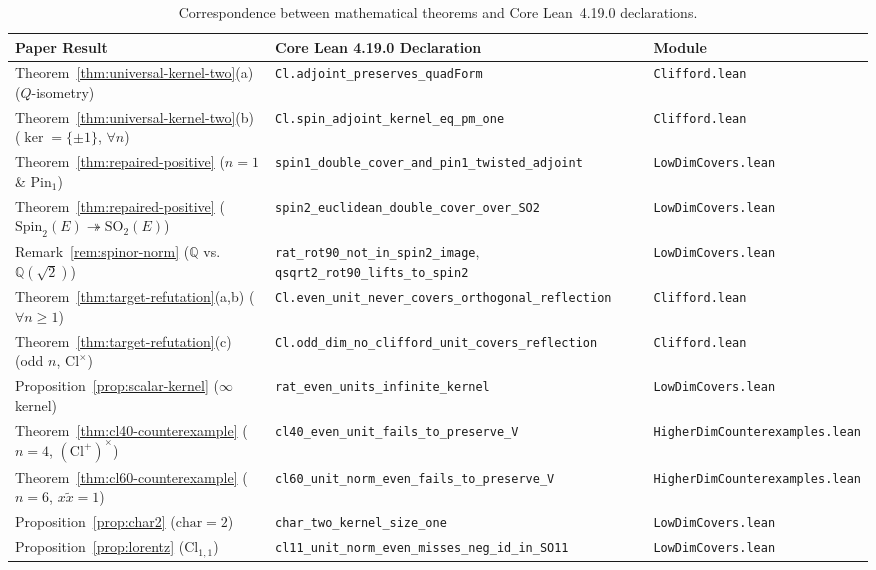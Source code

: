 \documentclass[11pt]{article}
\theoremstyle{definition}
\theoremstyle{remark}
\newcommand{\Cl}{\mathrm{Cl}}
\newcommand{\Spin}{\mathrm{Spin}}
\newcommand{\Pin}{\mathrm{Pin}}
\newcommand{\SO}{\mathrm{SO}}
\begin{document}
\begin{table}[ht]
\centering
\footnotesize
\renewcommand{\arraystretch}{1.22}
\begin{tabular}{@{}>{\raggedright\arraybackslash}p{}>{\raggedright\arraybackslash}p{}>{\raggedright\arraybackslash}p{}@{}}
\toprule
\textbf{Paper Result} & \textbf{Core Lean 4.19.0 Declaration} & \textbf{Module} \\
\midrule
Theorem~\ref{thm:universal-kernel-two}(a) ($Q$-isometry) & \nolinkurl{Cl.adjoint_preserves_quadForm} & \nolinkurl{Clifford.lean} \\
Theorem~\ref{thm:universal-kernel-two}(b) ($\ker = \{\pm 1\}$, $\forall n$) & \nolinkurl{Cl.spin_adjoint_kernel_eq_pm_one} & \nolinkurl{Clifford.lean} \\
Theorem~\ref{thm:repaired-positive} ($n=1$ \& $\Pin_1$) & \nolinkurl{spin1_double_cover_and_pin1_twisted_adjoint} & \nolinkurl{LowDimCovers.lean} \\
Theorem~\ref{thm:repaired-positive} ($\Spin_2(E) \twoheadrightarrow \SO_2(E)$) & \nolinkurl{spin2_euclidean_double_cover_over_SO2} & \nolinkurl{LowDimCovers.lean} \\
Remark~\ref{rem:spinor-norm} ($\mathbb{Q}$ vs.\ $\mathbb{Q}(\sqrt{2})$) & \nolinkurl{rat_rot90_not_in_spin2_image}, \nolinkurl{qsqrt2_rot90_lifts_to_spin2} & \nolinkurl{LowDimCovers.lean} \\
Theorem~\ref{thm:target-refutation}(a,b) ($\forall n \ge 1$) & \nolinkurl{Cl.even_unit_never_covers_orthogonal_reflection} & \nolinkurl{Clifford.lean} \\
Theorem~\ref{thm:target-refutation}(c) (odd $n$, $\Cl^\times$) & \nolinkurl{Cl.odd_dim_no_clifford_unit_covers_reflection} & \nolinkurl{Clifford.lean} \\
Proposition~\ref{prop:scalar-kernel} ($\infty$ kernel) & \nolinkurl{rat_even_units_infinite_kernel} & \nolinkurl{LowDimCovers.lean} \\
Theorem~\ref{thm:cl40-counterexample} ($n=4$, $(\Cl^+)^\times$) & \nolinkurl{cl40_even_unit_fails_to_preserve_V} & \nolinkurl{HigherDimCounterexamples.lean} \\
Theorem~\ref{thm:cl60-counterexample} ($n=6$, $x\widetilde{x}=1$) & \nolinkurl{cl60_unit_norm_even_fails_to_preserve_V} & \nolinkurl{HigherDimCounterexamples.lean} \\
Proposition~\ref{prop:char2} ($\mathrm{char}=2$) & \nolinkurl{char_two_kernel_size_one} & \nolinkurl{LowDimCovers.lean} \\
Proposition~\ref{prop:lorentz} ($\Cl_{1,1}$) & \nolinkurl{cl11_unit_norm_even_misses_neg_id_in_SO11} & \nolinkurl{LowDimCovers.lean} \\
\bottomrule
\end{tabular}
\caption{Correspondence between mathematical theorems and Core Lean~4.19.0 declarations.}
\label{tab:lean-map}
\end{table}
\end{document}
